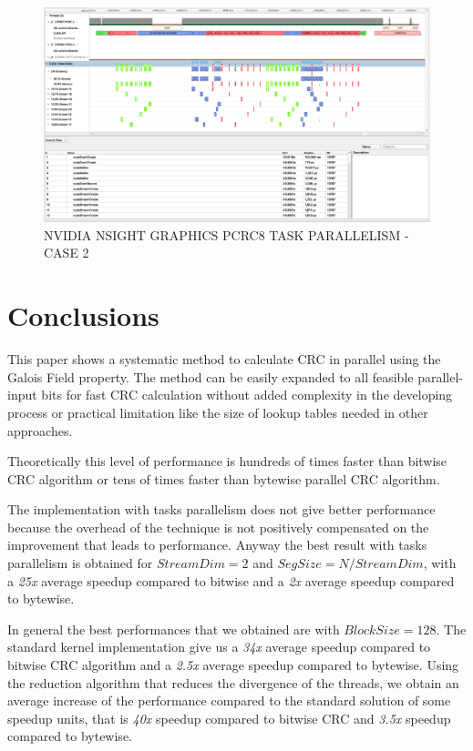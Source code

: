 \documentclass[fleqn]{IEEEtran}
\begin{document}
\begin{figure}[bt]
\centering
\includegraphics[width=\textwidth]{figures/NSG-PCRC8-task-parallelism-2.png}
\caption{NVIDIA NSIGHT GRAPHICS PCRC8 TASK PARALLELISM - CASE 2}
\label{fig:NSG-PCRC8-task-parallelism-2}
\end{figure}

\section{Conclusions}
This paper shows a systematic method to calculate CRC in parallel using the 
Galois Field property. The method can be easily expanded to all feasible
parallel-input bits for fast CRC calculation without added complexity in the 
developing process or practical limitation like the size of lookup tables 
needed in other approaches.

Theoretically this level of performance is hundreds of 
times faster than bitwise CRC algorithm or tens of times faster than 
bytewise parallel CRC algorithm.

The implementation with tasks parallelism does not give better performance 
because the overhead of the technique is not positively compensated on the 
improvement that leads to performance. Anyway the best result with tasks parallelism is obtained for $StreamDim=2$ and $SegSize=N/StreamDim$, with a \textit{25x} 
average speedup compared to bitwise and a \textit{2x} average speedup compared to bytewise. 

In general the best performances that we obtained are with $BlockSize=128$. The standard kernel implementation give us a \textit{34x} average speedup compared to bitwise CRC algorithm and a \textit{2.5x} average speedup compared to bytewise. Using the reduction algorithm that reduces the divergence 
of the threads, we obtain an average increase of the performance compared to the 
standard solution of some speedup units, that is \textit{40x} speedup compared to bitwise CRC and \textit{3.5x} speedup compared to bytewise. 
\end{document}
